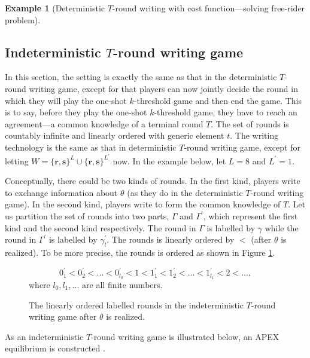 \documentclass[12pt,letter]{article}
\theoremstyle{definition}
\newtheorem{example}{Example}
\theoremstyle{remark}
\theoremstyle{claim}
\begin{document}
\begin{example}[Deterministic $T$-round writing with cost function---solving free-rider problem]
\end{example}


\subsection{Indeterministic $T$-round writing game}
In this section, the setting is exactly the same as that in the deterministic $T$-round writing game, except for that players can now jointly decide the round in which they will play the one-shot $k$-threshold game and then end the game. This is to say, before they play the one-shot $k$-threshold game, they have to reach an agreement---a common knowledge of a terminal round ${T}$. The set of rounds is countably infinite and linearly ordered with generic element $t$. The writing technology is the same as that in deterministic $T$-round writing game, except for letting $W=\{\textbf{r},\textbf{s}\}^L\cup \{\textbf{r},\textbf{s}\}^{L^{'}}$ now. In the example below, let $L=8$ and $L^{'}=1$. 

Conceptually, there could be two kinds of rounds. In the first kind, players write to exchange information about $\theta$ (as they do in the deterministic $T$-round writing game). In the second kind, players write to form the common knowledge of ${T}$. Let us partition the set of rounds into two parts, $\Gamma$ and $\Gamma^{'}$, which represent the first kind and the second kind respectively. The round in $\Gamma$ is labelled by $\gamma$ while the round in $\Gamma^{'}$ is labelled by $\gamma^{'}_l$. The rounds is linearly ordered by $<$ (after $\theta$ is realized). To be more precise, the rounds is ordered as shown in Figure \ref{fig:ordered_writing}.
\begin{figure}
\caption{The linearly ordered labelled rounds in the indeterministic $T$-round writing game after $\theta$ is realized.}
\label{fig:ordered_writing}
\[0^{'}_1<0^{'}_2<...<0^{'}_{l_0}<1<1^{'}_{1}<1^{'}_{2}<...<1^{'}_{l_1}<2<...,\]
where $l_0,l_1,...$ are all finite numbers.

\end{figure}
As an indeterministic $T$-round writing game is illustrated below, an APEX equilibrium is constructed .
\end{document}
